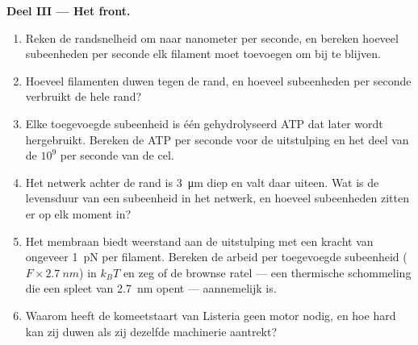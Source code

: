 \begin{problem}
\medskip
\noindent\textbf{Deel III --- Het front.}
\begin{enumerate}[resume]
  \item Reken de randsnelheid om naar nanometer per seconde, en bereken
        hoeveel subeenheden per seconde elk filament moet toevoegen om
        bij te blijven.
  \item Hoeveel filamenten duwen tegen de rand, en hoeveel subeenheden
        per seconde verbruikt de hele rand?
  \item Elke toegevoegde subeenheid is één gehydrolyseerd ATP dat later
        wordt hergebruikt. Bereken de ATP per seconde voor de
        uitstulping en het deel van de $10^{9}$ per seconde van de cel.
  \item Het netwerk achter de rand is \qty{3}{\micro m} diep en valt
        daar uiteen. Wat is de levensduur van een subeenheid in het
        netwerk, en hoeveel subeenheden zitten er op elk moment in?
  \item Het membraan biedt weerstand aan de uitstulping met een kracht
        van ongeveer \qty{1}{pN} per filament. Bereken de arbeid per
        toegevoegde subeenheid ($F\times \qty{2.7}{nm}$) in $k_{B}T$ en
        zeg of de brownse ratel --- een thermische schommeling die een
        spleet van \qty{2.7}{nm} opent --- aannemelijk is.
  \item Waarom heeft de komeetstaart van Listeria geen motor
        nodig, en hoe hard kan zij duwen als zij dezelfde machinerie
        aantrekt?
\end{enumerate}


\end{problem}

